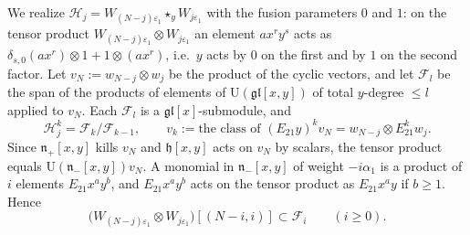 \documentclass[11pt]{amsart}
\numberwithin{equation}{section}
\theoremstyle{definition}
\newcommand{\gl}{\mathfrak{gl}}
\newcommand{\fh}{\mathfrak{h}}
\newcommand{\fn}{\mathfrak{n}}
\newcommand{\U}{\mathrm{U}}
\newcommand{\eps}{\varepsilon}
\begin{document}
	We realize $\mathcal H_j=W_{(N-j)\eps_1}\star_yW_{j\eps_1}$ with the fusion parameters $0$ and $1$: on the tensor product $W_{(N-j)\eps_1}\otimes W_{j\eps_1}$ an element $ax^ry^s$ acts as $\delta_{s,0}(ax^r)\otimes1+1\otimes(ax^r)$, i.e.\ $y$ acts by $0$ on the first and by $1$ on the second factor. Let $v_N:=w_{N-j}\otimes w_j$ be the product of the cyclic vectors, and let $\mathcal F_l$ be the span of the products of elements of $\U(\gl[x,y])$ of total $y$-degree $\le l$ applied to $v_N$. Each $\mathcal F_l$ is a $\gl[x]$-submodule, and
	\[
	\mathcal H_j^k=\mathcal F_k/\mathcal F_{k-1},\qquad v_k:=\text{the class of }(E_{21}y)^kv_N=w_{N-j}\otimes E_{21}^kw_j .
	\]
	Since $\fn_+[x,y]$ kills $v_N$ and $\fh[x,y]$ acts on $v_N$ by scalars, the tensor product equals $\U(\fn_-[x,y])v_N$. A monomial in $\fn_-[x,y]$ of weight $-i\alpha_1$ is a product of $i$ elements $E_{21}x^ay^b$, and $E_{21}x^ay^b$ acts on the tensor product as $E_{21}x^ay$ if $b\ge1$. Hence
	\begin{equation}\label{eq:weight-filtration}
		\big(W_{(N-j)\eps_1}\otimes W_{j\eps_1}\big)[(N-i,i)]\subset\mathcal F_i\qquad(i\ge0).
	\end{equation}
	
\end{document}

